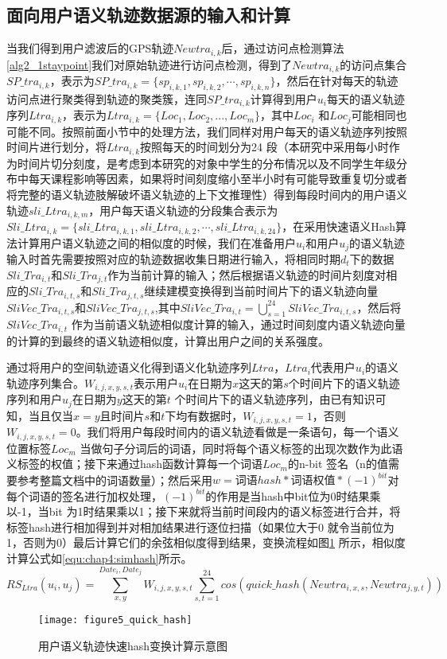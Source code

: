\subsection{面向用户语义轨迹数据源的输入和计算}
当我们得到用户滤波后的GPS轨迹$Newtra_{i,k}$后，通过访问点检测算法\ref{alg2_1staypoint}我们对原始轨迹进行访问点检测，得到了$Newtra_{i,k}$的访问点集合$SP\_tra_{i,k}$，表示为$SP\_tra_{i,k}=\{ sp_{i,k,1},sp_{i,k,2},\cdots , sp_{i,k,n} \}$，然后在针对每天的轨迹访问点进行聚类得到轨迹的聚类簇，连同$SP\_tra_{i,k}$计算得到用户$u_{i}$每天的语义轨迹序列$Ltra_{i,k}$，表示为$ Ltra_{i,k}=\{Loc_{1},Loc_{2},...,Loc_{m}\}$，其中$Loc_{i}$ 和$Loc_{j}$可能相同也可能不同。按照前面小节中的处理方法，我们同样对用户每天的语义轨迹序列按照时间片进行划分，将$ Ltra_{i,k}$按照每天的时间划分为24 段（本研究中采用每小时作为时间片切分刻度，是考虑到本研究的对象中学生的分布情况以及不同学生年级分布中每天课程影响等因素，如果将时间刻度缩小至半小时有可能导致重复切分或者将完整的语义轨迹肢解破坏语义轨迹的上下文推理性）得到每段时间内的用户语义轨迹$sli\_Ltra_{i,k,m}$，用户每天语义轨迹的分段集合表示为$Sli\_Ltra_{i,k}=\{sli\_Ltra_{i,k,1},sli\_Ltra_{i,k,2},\cdots,sli\_Ltra_{i,k,24}\}$，在采用快速语义Hash算法计算用户语义轨迹之间的相似度的时候，我们在准备用户$u_{i}$和用户$u_{j}$的语义轨迹输入时首先需要按照对应的轨迹数据收集日期进行输入，将相同时期$d_{t}$下的数据$Sli\_Tra_{i,t}$和$Sli\_Tra_{j,t}$作为当前计算的输入；然后根据语义轨迹的时间片刻度对相应的$Sli\_Tra_{i,t,s}$和$Sli\_Tra_{j,t,s}$继续建模变换得到当前时间片下的语义轨迹向量$SliVec\_Tra_{i,t,s}$和$SliVec\_Tra_{j,t,s}$,其中$SliVec\_Tra_{i,t}=\bigcup_{s=1}^{24}SliVec\_Tra_{i,t,s}$，然后将$SliVec\_Tra_{i,t}$ 作为当前语义轨迹相似度计算的输入，通过时间刻度内语义轨迹向量的计算的到最终的语义轨迹相似度，计算出用户之间的关系强度。
\par 通过将用户的空间轨迹语义化得到语义化轨迹序列$Ltra$，$Ltra_{i}$代表用户$u_{i}$的语义轨迹序列集合。$W_{i,j,x,y,s,t}$表示用户$u_{i}$在日期为$x$这天的第$s$个时间片下的语义轨迹序列和用户$u_{j}$在日期为$y$这天的第$t$ 个时间片下的语义轨迹序列，由已有知识可知，当且仅当$x=y$且时间片$s$和$t$下均有数据时，$W_{i,j,x,y,s,t}=1$，否则$W_{i,j,x,y,s,t}=0$。我们将用户每段时间内的语义轨迹看做是一条语句，每一个语义位置标签$Loc_{m}$ 当做句子分词后的词语，同时将每个语义标签的出现次数作为此语义标签的权值；接下来通过hash函数计算每一个词语$Loc_{m}$的n-bit 签名（n的值需要参考整篇文档中的词语数量）；然后采用$w=\text{词语}hash*\text{词语权值}*(-1)^{bit}$对每个词语的签名进行加权处理，$(-1)^{bit}$的作用是当hash中bit位为0时结果乘以-1，当bit 为1时结果乘以1；接下来就将当前时间段内的语义标签进行合并，将标签hash进行相加得到并对相加结果进行逐位扫描（如果位大于0 就令当前位为1，否则为0）最后计算它们的余弦相似度得到结果，变换流程如图\ref{fig:quick_hash} 所示，相似度计算公式如\ref{equ:chap4:simhash}所示。
\begin{equation}
\label{equ:chap4:simhash}
RS_{Ltra}(u_{i},u_{j})=\sum_{x ,y }^{ Date_{i}, Date_{j}}W_{i,j,x,y,s,t}\sum_{s,t=1}^{24} cos(quick\_hash(Newtra_{i,x,s},Newtra_{j,y,t}))
\end{equation}
\begin{figure}[htb]
\centering
\texttt{[image: figure5\_quick\_hash]}
\caption{用户语义轨迹快速hash变换计算示意图}
\label{fig:quick_hash}
\end{figure}

